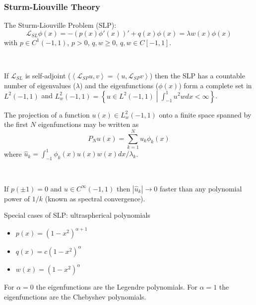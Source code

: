 \documentclass{beamer}
\newcommand{\abs}[1]{\left \vert #1 \right \vert}
\newcommand{\Set}[2]{\left \{ #1 \middle \vert #2 \right \}}
\newcommand{\inner}[2]{\left \langle #1, #2 \right \rangle}
\begin{document}
\begin{frame}

\frametitle{Sturm-Liouville Theory}

The Sturm-Liouville Problem (SLP):
\begin{equation*}
\mathcal{L}_{SL} \phi(x) = -\left ( p(x) \phi'(x) \right )' + q(x) \phi(x) = \lambda w(x) \phi(x)
\end{equation*}
with $p \in C^1(-1,1)$, $p>0$, $q, w \geq 0$, $q, w \in C[-1,1]$.

~

If $\mathcal{L}_{SL}$ is self-adjoint ($\inner{\mathcal{L}_{SP}u}{v} = \inner{u}{\mathcal{L}_{SP}v}$) then the SLP has a countable number of eigenvalues ($\lambda$) and the eigenfunctions ($\phi(x)$) form a complete set in $L^2(-1,1)$ and $L_w^2(-1,1) = \Set{u \in L^2(-1,1)}{\int_{-1}^1 u^2 w dx < \infty}$.
\end{frame}

\begin{frame}

The projection of a function $u(x) \in L_w^2(-1,1)$ onto a finite space spanned by the first $N$ eigenfunctions may be written as
\begin{equation*}
P_N u(x) = \sum_{k=1}^N \hat{u}_k \phi_k(x)
\end{equation*}
where $\hat{u}_k = \int_{-1}^1 \phi_k(x) u(x) w(x) dx / \lambda_k$.

~

If $p(\pm 1) = 0$ and $u \in C^\infty(-1,1)$ then $\abs{\hat{u}_k} \to 0$ faster than any polynomial power of $1/k$ (known as spectral convergence).

\end{frame}

\begin{frame}

Special cases of SLP: ultraspherical polynomials
\begin{itemize}
\item $p(x) = (1-x^2)^{\alpha+1}$
\item $q(x) =c(1-x^2)^\alpha$
\item $w(x) = (1-x^2)^\alpha$
\end{itemize}
For $\alpha = 0$ the eigenfunctions are the Legendre polynomials.
For $\alpha = 1$ the eigenfunctions are the Chebyshev polynomials.

\end{frame}
\end{document}
